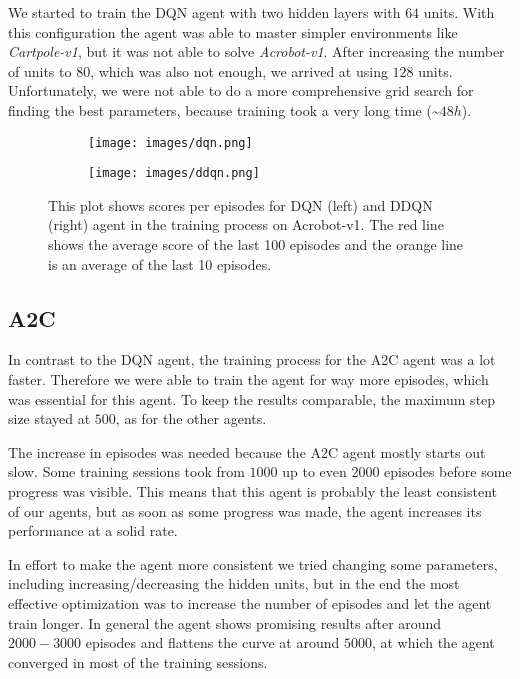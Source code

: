 \documentclass[11pt,a4paper]{article}
\begin{document}
We started to train the DQN agent with two hidden layers with $64$ units. With this configuration the agent was able to master simpler environments like \textit{Cartpole-v1}, but it was not able to solve \textit{Acrobot-v1}. After increasing the number of units to $80$, which was also not enough, we arrived at using $128$ units. Unfortunately, we were not able to do a more comprehensive grid search for finding the best parameters, because training took a very long time (\sim$48h$).

\begin{figure}[h]
\centering
\begin{subfigure}
    \centering
    \texttt{[image: images/dqn.png]}
\end{subfigure}%
\begin{subfigure}
    \centering
    \texttt{[image: images/ddqn.png]}
\end{subfigure}
\caption{This plot shows scores per episodes for DQN (left) and DDQN (right) agent in the training process on Acrobot-v1. The red line shows the average score of the last 100 episodes and the orange line is an average of the last 10 episodes.}
\label{fig:dqn_ddqn_result}
\end{figure}



\subsection{A2C}

In contrast to the DQN agent, the training process for the A2C agent was a lot faster. Therefore we were able to train the agent for way more episodes, which was essential for this agent. To keep the results comparable, the maximum step size stayed at $500$, as for the other agents. 

The increase in episodes was needed because the A2C agent mostly starts out slow. Some training sessions took from $1000$ up to even $2000$ episodes before some progress was visible. This means that this agent is probably the least consistent of our agents, but as soon as some progress was made, the agent increases its performance at a solid rate. 

In effort to make the agent more consistent we tried changing some parameters, including increasing/decreasing the hidden units, but in the end the most effective optimization was to increase the number of episodes and let the agent train longer. In general the agent shows promising results after around $2000-3000$ episodes and flattens the curve at around $5000$, at which the agent converged in most of the training sessions.
\end{document}

